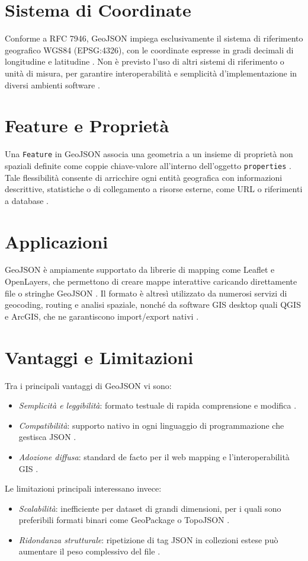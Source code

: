 \section{Sistema di Coordinate}
Conforme a RFC 7946, GeoJSON impiega esclusivamente il sistema di riferimento geografico WGS84 (EPSG:4326), con le coordinate espresse in gradi decimali di longitudine e latitudine \cite{rfc7946}. Non è previsto l'uso di altri sistemi di riferimento o unità di misura, per garantire interoperabilità e semplicità d'implementazione in diversi ambienti software \cite{ibm-geojson}.

\section{Feature e Proprietà}
Una \texttt{Feature} in GeoJSON associa una geometria a un insieme di proprietà non spaziali definite come coppie chiave-valore all'interno dell'oggetto \texttt{properties} \cite{geojson-spec}. Tale flessibilità consente di arricchire ogni entità geografica con informazioni descrittive, statistiche o di collegamento a risorse esterne, come URL o riferimenti a database \cite{geojson-wiki}.

\section{Applicazioni}
GeoJSON è ampiamente supportato da librerie di mapping come Leaflet e OpenLayers, che permettono di creare mappe interattive caricando direttamente file o stringhe GeoJSON \cite{leaflet-geojson,openlayers-geojson}. Il formato è altresì utilizzato da numerosi servizi di geocoding, routing e analisi spaziale, nonché da software GIS desktop quali QGIS e ArcGIS, che ne garantiscono import/export nativi \cite{arcgis-geojson}.

\section{Vantaggi e Limitazioni}
Tra i principali vantaggi di GeoJSON vi sono:
\begin{itemize}
  \item \emph{Semplicità e leggibilità}: formato testuale di rapida comprensione e modifica \cite{when-use-geojson}.
  \item \emph{Compatibilità}: supporto nativo in ogni linguaggio di programmazione che gestisca JSON \cite{geojson-spec}.
  \item \emph{Adozione diffusa}: standard de facto per il web mapping e l'interoperabilità GIS \cite{gdal-geojson}.
\end{itemize}
Le limitazioni principali interessano invece:
\begin{itemize}
  \item \emph{Scalabilità}: inefficiente per dataset di grandi dimensioni, per i quali sono preferibili formati binari come GeoPackage o TopoJSON \cite{when-use-geojson}.
  \item \emph{Ridondanza strutturale}: ripetizione di tag JSON in collezioni estese può aumentare il peso complessivo del file \cite{when-use-geojson}.
\end{itemize}

